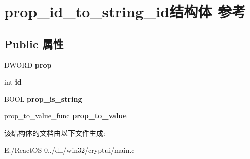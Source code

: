 \hypertarget{structprop__id__to__string__id}{}\section{prop\+\_\+id\+\_\+to\+\_\+string\+\_\+id结构体 参考}
\label{structprop__id__to__string__id}
\subsection*{Public 属性}
\begin{DoxyCompactItemize}
\item 
\mbox{\label{structprop__id__to__string__id_a22f09cd4d4fbe08bbde834d91a0071a1}} 
D\+W\+O\+RD {\bfseries prop}
\item 
\mbox{\label{structprop__id__to__string__id_a1a336858845d260f81e1562097019470}} 
int {\bfseries id}
\item 
\mbox{\label{structprop__id__to__string__id_a2a33f6dadb7e6e25256a96152fba1503}} 
B\+O\+OL {\bfseries prop\+\_\+is\+\_\+string}
\item 
\mbox{\label{structprop__id__to__string__id_a78953c06c3f55ba7637a10472b0327f6}} 
prop\+\_\+to\+\_\+value\+\_\+func {\bfseries prop\+\_\+to\+\_\+value}
\end{DoxyCompactItemize}


该结构体的文档由以下文件生成\+:\begin{DoxyCompactItemize}
\item 
E\+:/\+React\+O\+S-\/0../dll/win32/cryptui/main.\+c\end{DoxyCompactItemize}
